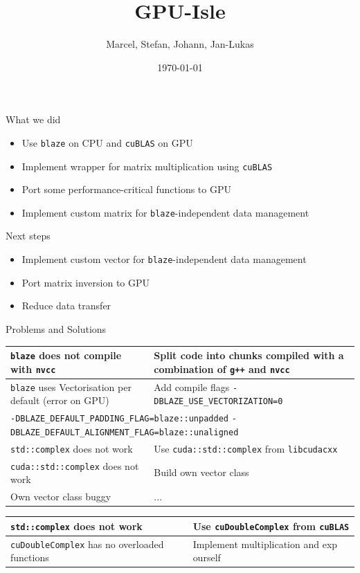 \documentclass{beamer}
\title{GPU-Isle}
\author{Marcel, Stefan, Johann, Jan-Lukas}
\institute{JSC, JSC, Uni Bonn, ESS}
\date{\today}
\begin{document}

\begin{frame}{What we did}
	\begin{itemize}
		\item Use \texttt{blaze} on CPU and \texttt{cuBLAS} on GPU
		\item Implement wrapper for matrix multiplication using \texttt{cuBLAS}
		\item Port some performance-critical functions to GPU
		\item Implement custom matrix for \texttt{blaze}-independent data management
	\end{itemize}
\end{frame}

\begin{frame}{Next steps}
	\begin{itemize}
		\item Implement custom vector for \texttt{blaze}-independent data management
		\item Port matrix inversion to GPU
		\item Reduce data transfer
	\end{itemize}
\end{frame}

\begin{frame}{Problems and Solutions}
	{\color{lightgray}
	\begin{tabular}{|p{}|p{}|}
		\hline
		\texttt{blaze} does not compile with \texttt{nvcc} & Split code into chunks compiled with a combination of \texttt{g++} and \texttt{nvcc}\\\hline
		\texttt{blaze} uses Vectorisation per default (error on GPU) & Add compile flags \texttt{-DBLAZE\_USE\_VECTORIZATION=0}\\\cline{1-1}
		\multicolumn{2}{|p{0.9\textwidth}|}{\texttt{-DBLAZE\_DEFAULT\_PADDING\_FLAG=blaze::unpadded} \texttt{-DBLAZE\_DEFAULT\_ALIGNMENT\_FLAG=blaze::unaligned}}\\\hline
		\texttt{std::complex} does not work & Use \texttt{cuda::std::complex} from \texttt{libcudacxx} \\\hline
		\texttt{cuda::std::complex} does not work & Build own vector class \\\hline
		Own vector class buggy & ... \\\hline
	\end{tabular}
	}
	\begin{tabular}{|p{}|p{}|}
		\hline
		\texttt{std::complex} does not work & Use \texttt{cuDoubleComplex} from \texttt{cuBLAS} \\\hline
		\texttt{cuDoubleComplex} has no overloaded functions & Implement multiplication and exp ourself \\\hline
	\end{tabular}
\end{frame}
\end{document}

